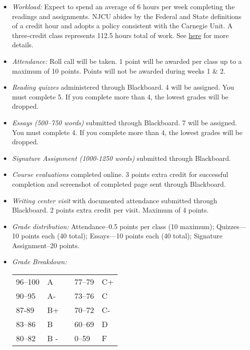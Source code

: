 \documentclass[article,oneside]{memoir}
\begin{document}
\begin{itemize}
\item \textit{Workload:} Expect to spend an average of 6 hours per week completing the readings and assignments. NJCU abides by the Federal and State definitions of a credit hour and adopts a policy consistent with the Carnegie Unit. A three-credit class represents 112.5 hours total of work. See \href{http://scottoconnor.org/resources/Credit.pdf}{here} for more details.

\item \textit{Attendance:} Roll call will be taken. 1 point will be awarded per class up to a maximum of 10 points. Points will not be awarded during weeks 1 \& 2. 

\item \textit{Reading quizzes} administered through Blackboard. 4 will be assigned. You must complete 5. If you complete more than 4, the lowest grades will be dropped. 


\item \textit{Essays (500--750 words)} submitted through Blackboard.  7 will be assigned. You must complete 4. If you complete more than 4, the lowest grades will be dropped. 

\item \textit{Signature Assignment (1000-1250 words)} submitted through Blackboard. 

\item \textit{Course evaluations} completed online. 3 points extra credit for successful completion  and screenshot of completed page sent through Blackboard. 

\item \textit{Writing center visit} with documented attendance submitted through Blackboard. 2 points extra credit per visit. Maximum of 4 points.  
  
\item \textit{Grade distribution:} Attendance--0.5 points per class (10 maximum); Quizzes---10 points each (40 total);  Essays---10 points each (40 total); Signature Assignment--20 points.


\item \textit{Grade Breakdown:}

 \begin{tabular}{ | l | l | p{2cm} | l | l | }
    \hline 
96--100 & A  & &  77--79 &  C+ \\  
90--95 & A- & &  73--76 & C \\
87-89 & B+ &  &  70--72 & C- \\ 
83--86 & B  & &  60--69 & D\\
80--82 & B - & & 0--59 & F\\ \hline
    \end{tabular}


\end{itemize}
\end{document}
